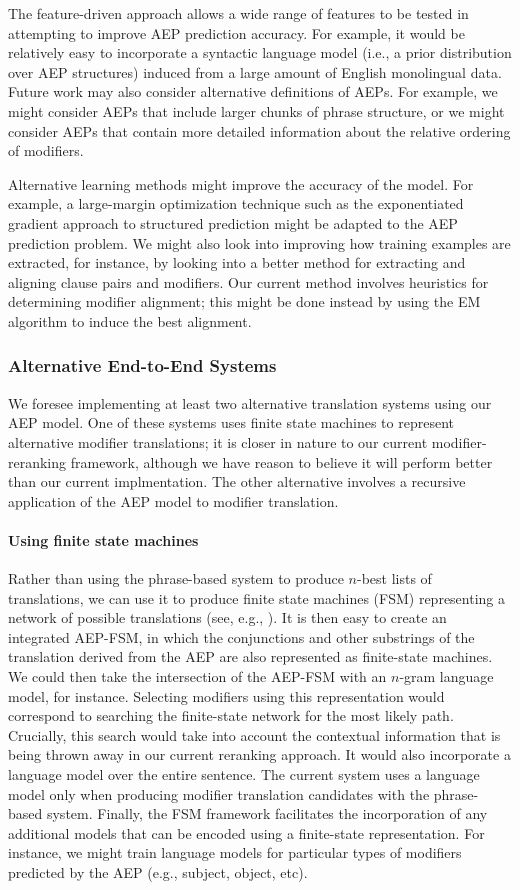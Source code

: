 \documentclass[10pt]{report}
\theoremstyle{plain}
\begin{document}
{The feature-driven approach allows a wide range of features to be
tested in attempting to improve AEP prediction accuracy. For example,
it would be relatively easy to incorporate a syntactic language model
(i.e., a prior distribution over AEP structures) induced from a large
amount of English monolingual data. Future work may also consider
alternative definitions of AEPs. For example, we might consider AEPs
that include larger chunks of phrase structure, or we might consider
AEPs that contain more detailed information about the relative
ordering of modifiers.

Alternative learning methods might improve the accuracy of the
model. For example, a large-margin optimization technique such as the
exponentiated gradient approach to structured prediction 
might be adapted to the AEP prediction problem. We might also look
into improving how training examples are extracted, for instance, by
looking into a better method for extracting and aligning clause pairs
and modifiers. Our current method involves heuristics for determining
modifier alignment; this might be done instead by using the EM
algorithm to induce the best alignment.

\subsubsection{Alternative End-to-End Systems}
We foresee implementing at least two alternative translation systems
using our AEP model. One of these systems uses finite state machines
to represent alternative modifier translations; it is closer in nature
to our current modifier-reranking framework, although we have reason
to believe it will perform better than our current implmentation. The
other alternative involves a recursive application of the AEP model to
modifier translation.

\paragraph{Using finite state machines}
Rather than using the phrase-based system to produce $n$-best lists of
translations, we can use it to produce finite state machines (FSM)
representing a network of possible translations (see, e.g.,
). It is then easy to create an integrated AEP-FSM, in
which the conjunctions and other substrings of the translation derived
from the AEP are also represented as finite-state machines. We could
then take the intersection of the AEP-FSM with an $n$-gram language
model, for instance. Selecting modifiers using this representation
would correspond to searching the finite-state network for the most
likely path. Crucially, this search would take into account the
contextual information that is being thrown away in our current
reranking approach. It would also incorporate a language model over
the entire sentence. The current system uses a language model only
when producing modifier translation candidates with the phrase-based
system. Finally, the FSM framework facilitates the incorporation of
any additional models that can be encoded using a finite-state
representation. For instance, we might train language models for
particular types of modifiers predicted by the AEP (e.g., subject,
object, etc).

}
\end{document}
